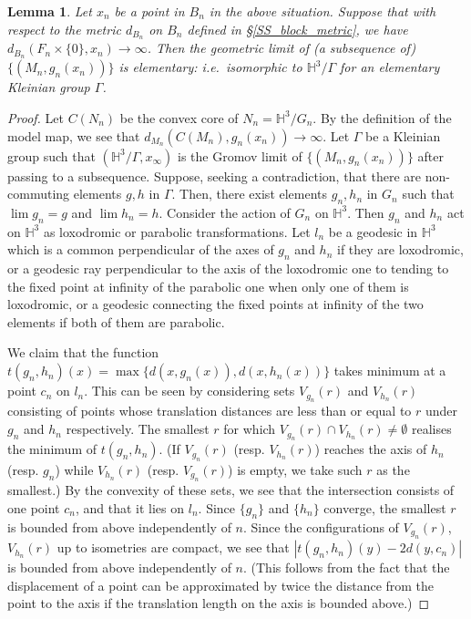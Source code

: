 \documentclass{amsart}
\newtheorem{lemma}[theorem]{Lemma}
\theoremstyle{definition}
\numberwithin{figure}{section}
\numberwithin{equation}{section}
\newcommand{\blackboard}[1]{\ensuremath{\mathbb{#1}}}
\newcommand{\hyperbolic}{\blackboard{H}}
\newcommand{\ie}{i.e.\ }
\begin{document}
\begin{lemma}
\label{geometrically finite end}
Let $x_n$ be a point in $B_n$ in the above situation.
Suppose that with respect to the metric $d_{B_n}$ on $B_n$ defined in \S\ref{SS_block_metric}, we have $d_{B_n}(F_n \times \{0\}, x_n) \rightarrow \infty$.
Then the geometric limit of (a subsequence of) $\{(M_n, g_n(x_n))\}$ is elementary: \ie isomorphic to $\hyperbolic^3/\Gamma$ for an elementary Kleinian group $\Gamma$.
\end{lemma}
\begin{proof}
Let $C(N_n)$ be the convex core of $N_n=\hyperbolic^3/G_n$.
By the definition of the model map, we see that $d_{M_n}(C(M_n), g_n(x_n))\rightarrow \infty$.
Let $\Gamma$ be a Kleinian group such that $(\hyperbolic^3/\Gamma, x_\infty)$ is the Gromov limit of  $\{(M_n, g_n(x_n))\}$ after passing to a subsequence.
Suppose, seeking a contradiction, that there are non-commuting elements $g, h$ in $\Gamma$.
Then, there exist elements $g_n, h_n$ in $G_n$ such that $\lim g_n=g$ and $\lim h_n=h$.
Consider the action of $G_n$ on $\hyperbolic^3$.
Then $g_n$ and $h_n$ act on $\hyperbolic^3$ as loxodromic or parabolic transformations.
Let $l_n$ be a geodesic  in $\hyperbolic^3$ which is a common perpendicular of the axes of $g_n$ and $h_n$ if they are loxodromic, or a geodesic ray perpendicular to the axis of the loxodromic one to tending to the fixed point at infinity of the parabolic one when only one of them is loxodromic, or a geodesic connecting the fixed points at infinity of the two elements if both of them are parabolic.

We claim that the function $t(g_n, h_n)(x)=\max\{d(x, g_n(x)), d(x,h_n(x))\}$ takes minimum at a point $c_n$ on $l_n$.
This can be seen by considering sets $V_{g_n}(r)$ and $V_{h_n}(r)$ consisting of points whose translation distances are less than or equal to $r$ under $g_n$ and  $h_n$ respectively.
The smallest $r$ for which $V_{g_n}(r) \cap V_{h_n}(r) \neq \emptyset$ realises the minimum of $t(g_n, h_n)$.
(If $V_{g_n}(r)$ (resp. $V_{h_n}(r)$) reaches the axis of $h_n$ (resp. $g_n$) while $V_{h_n}(r)$ (resp. $V_{g_n}(r)$) is empty, we take such $r$ as the smallest.)
By the convexity of these sets, we see that the intersection consists of one point $c_n$, and that it lies on $l_n$.
Since $\{g_n\}$ and $\{h_n\}$ converge, the smallest $r$ is bounded from above independently of $n$.
Since the configurations of $V_{g_n}(r)$, $V_{h_n}(r)$ up to isometries are compact, we see that $|t(g_n, h_n)(y)- 2d(y,c_n)|$ is bounded from above independently of $n$.
(This follows from the fact that the displacement of a point can be approximated by twice the distance from the point to the axis if the translation length on the axis is bounded above.)



\end{proof}
\end{document}
